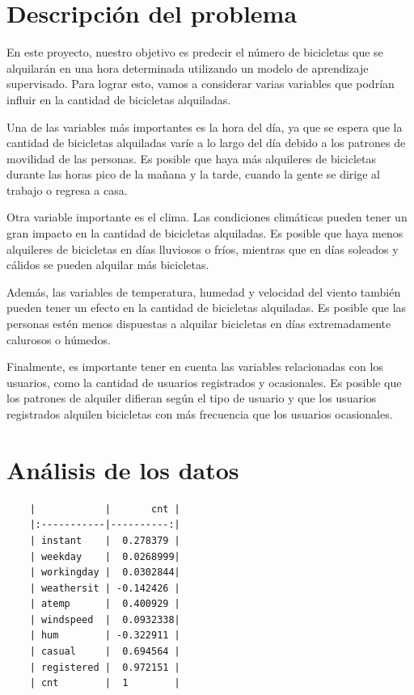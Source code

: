 \documentclass{wsdcr}
\begin{document}
\section{Descripción del problema}
En este proyecto, nuestro objetivo es predecir el número de bicicletas que se alquilarán en una hora determinada utilizando un modelo de aprendizaje supervisado. Para lograr esto, vamos a considerar varias variables que podrían influir en la cantidad de bicicletas alquiladas.

Una de las variables más importantes es la hora del día, ya que se espera que la cantidad de bicicletas alquiladas varíe a lo largo del día debido a los patrones de movilidad de las personas. Es posible que haya más alquileres de bicicletas durante las horas pico de la mañana y la tarde, cuando la gente se dirige al trabajo o regresa a casa.

Otra variable importante es el clima. Las condiciones climáticas pueden tener un gran impacto en la cantidad de bicicletas alquiladas. Es posible que haya menos alquileres de bicicletas en días lluviosos o fríos, mientras que en días soleados y cálidos se pueden alquilar más bicicletas.

Además, las variables de temperatura, humedad y velocidad del viento también pueden tener un efecto en la cantidad de bicicletas alquiladas. Es posible que las personas estén menos dispuestas a alquilar bicicletas en días extremadamente calurosos o húmedos.

Finalmente, es importante tener en cuenta las variables relacionadas con los usuarios, como la cantidad de usuarios registrados y ocasionales. Es posible que los patrones de alquiler difieran según el tipo de usuario y que los usuarios registrados alquilen bicicletas con más frecuencia que los usuarios ocasionales.

\section{Análisis de los datos}

\begin{verbatim}
    |            |       cnt |
    |:-----------|----------:|
    | instant    |  0.278379 |
    | weekday    |  0.0268999|
    | workingday |  0.0302844|
    | weathersit | -0.142426 |
    | atemp      |  0.400929 |
    | windspeed  |  0.0932338|
    | hum        | -0.322911 |
    | casual     |  0.694564 |
    | registered |  0.972151 |
    | cnt        |  1        |
\end{verbatim}
\end{document}
